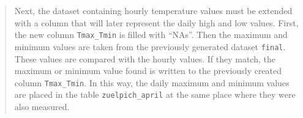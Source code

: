 \documentclass[
]{book}
\begin{document}
\begin{quote}
Next, the dataset containing hourly temperature values must be extended with a column that will later represent the daily high and low values. First, the new column \texttt{Tmax\_Tmin} is filled with ``NAs''. Then the maximum and minimum values are taken from the previously generated dataset \texttt{final}. These values are compared with the hourly values. If they match, the maximum or minimum value found is written to the previously created column \texttt{Tmax\_Tmin}. In this way, the daily maximum and minimum values are placed in the table \texttt{zuelpich\_april} at the same place where they were also measured.
\end{quote}

  
\end{document}
